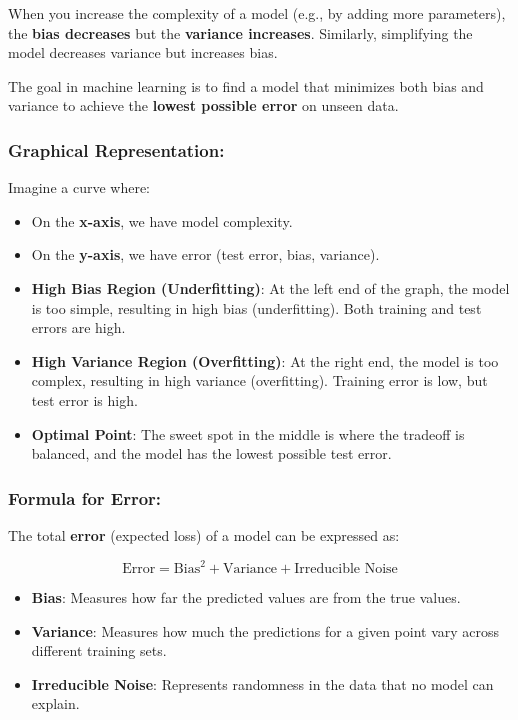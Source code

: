 \documentclass[12pt]{book}
\begin{document}
When you increase the complexity of a model (e.g., by adding more parameters), the \textbf{bias decreases} but the \textbf{variance increases}. Similarly, simplifying the model decreases variance but increases bias.

The goal in machine learning is to find a model that minimizes both bias and variance to achieve the \textbf{lowest possible error} on unseen data.

\subsubsection*{Graphical Representation:}

Imagine a curve where:

\begin{itemize}
    \item [-] On the \textbf{x-axis}, we have model complexity.
    \item [-] On the \textbf{y-axis}, we have error (test error, bias, variance).
    \item [-] \textbf{High Bias Region (Underfitting)}: At the left end of the graph, the model is too simple, resulting in high bias (underfitting). Both training and test errors are high.
    \item [-] \textbf{High Variance Region (Overfitting)}: At the right end, the model is too complex, resulting in high variance (overfitting). Training error is low, but test error is high.
    \item [-] \textbf{Optimal Point}: The sweet spot in the middle is where the tradeoff is balanced, and the model has the lowest possible test error.
\end{itemize}

\subsubsection*{Formula for Error:}
The total \textbf{error} (expected loss) of a model can be expressed as:

\[
\text{Error} = \text{Bias}^2 + \text{Variance} + \text{Irreducible Noise}
\]

\begin{itemize}
    \item [-] \textbf{Bias}: Measures how far the predicted values are from the true values.
    \item [-] \textbf{Variance}: Measures how much the predictions for a given point vary across different training sets.
    \item [-] \textbf{Irreducible Noise}: Represents randomness in the data that no model can explain.
\end{itemize}
\end{document}
